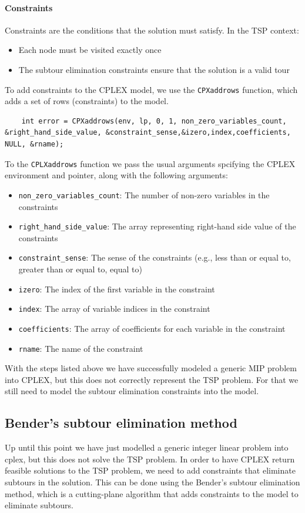\documentclass{article}
\begin{document}
\paragraph{Constraints}
Constraints are the conditions that the solution must satisfy. In the TSP context:
\begin{itemize}
	\item Each node must be visited exactly once
	\item The subtour elimination constraints ensure that the solution is a valid tour
\end{itemize}
To add constraints to the CPLEX model, we use the \texttt{CPXaddrows} function, which adds a set of rows (constraints) to the model.
\begin{lstlisting}
	int error = CPXaddrows(env, lp, 0, 1, non_zero_variables_count, &right_hand_side_value, &constraint_sense,&izero,index,coefficients, NULL, &rname);
\end{lstlisting}
To the \texttt{CPLXaddrows} function we pass the usual arguments spcifying the CPLEX environment and pointer, along with the following arguments:
\begin{itemize}
	\item \texttt{non\_zero\_variables\_count}: The number of non-zero variables in the constraints
	\item \texttt{right\_hand\_side\_value}: The array representing right-hand side value of the constraints
	\item \texttt{constraint\_sense}: The sense of the constraints (e.g., less than or equal to, greater than or equal to, equal to)
	\item \texttt{izero}: The index of the first variable in the constraint
	\item \texttt{index}: The array of variable indices in the constraint
	\item \texttt{coefficients}: The array of coefficients for each variable in the constraint
	\item \texttt{rname}: The name of the constraint
\end{itemize}

With the steps listed above we have successfully modeled a generic MIP problem into CPLEX, but this does not correctly represent the TSP problem. 
For that we still need to model the subtour elimination constraints into the model.

\subsection{Bender's subtour elimination method} 
Up until this point we have just modelled a generic integer linear problem into cplex, but this does not solve the TSP problem.
In order to have CPLEX return feasible solutions to the TSP problem, we need to add constraints that eliminate subtours in the solution.
This can be done using the Bender's subtour elimination method, which is a cutting-plane algorithm that adds constraints to the model to eliminate subtours.
\end{document}
